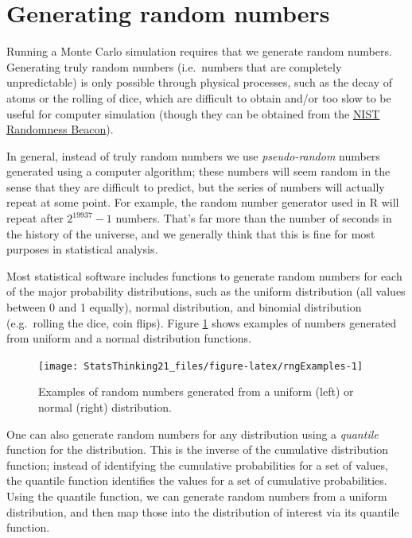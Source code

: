 \documentclass[12pt,]{book}
\theoremstyle{definition}
\theoremstyle{definition}
\theoremstyle{definition}
\theoremstyle{remark}
\begin{document}
\hypertarget{generating-random-numbers}{%
\section{Generating random numbers}\label{generating-random-numbers}}

Running a Monte Carlo simulation requires that we generate random numbers. Generating truly random numbers (i.e.~numbers that are completely unpredictable) is only possible through physical processes, such as the decay of atoms or the rolling of dice, which are difficult to obtain and/or too slow to be useful for computer simulation (though they can be obtained from the \href{https://www.nist.gov/programs-projects/nist-randomness-beacon\%5D}{NIST Randomness Beacon}).

In general, instead of truly random numbers we use \emph{pseudo-random} numbers generated using a computer algorithm; these numbers will seem random in the sense that they are difficult to predict, but the series of numbers will actually repeat at some point. For example, the random number generator used in R will repeat after \(2^{19937} - 1\) numbers. That's far more than the number of seconds in the history of the universe, and we generally think that this is fine for most purposes in statistical analysis.

Most statistical software includes functions to generate random numbers for each of the major probability distributions, such as the uniform distribution (all values between 0 and 1 equally), normal distribution, and binomial distribution (e.g.~rolling the dice, coin flips). Figure \ref{fig:rngExamples} shows examples of numbers generated from uniform and a normal distribution functions.

\begin{figure}
\texttt{[image: StatsThinking21\_files/figure-latex/rngExamples-1]} \caption{Examples of random numbers generated from a uniform (left) or normal (right) distribution.}\label{fig:rngExamples}
\end{figure}

One can also generate random numbers for any distribution using a \emph{quantile} function for the distribution. This is the inverse of the cumulative distribution function; instead of identifying the cumulative probabilities for a set of values, the quantile function identifies the values for a set of cumulative probabilities. Using the quantile function, we can generate random numbers from a uniform distribution, and then map those into the distribution of interest via its quantile function.
\end{document}
